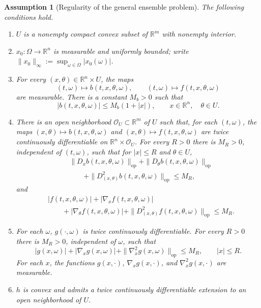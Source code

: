 \documentclass[10pt,a4paper]{amsart}
\newtheorem{assumption}{Assumption}
\begin{document}
\begin{assumption}[Regularity of the general ensemble problem]
\label{ass:general-first-variation}
The following conditions hold.
\begin{enumerate}
    \item $U$ is a nonempty compact convex subset of $\mathbb R^m$ with nonempty interior.
    \item $x_0:\Omega\to\mathbb R^n$ is measurable and uniformly bounded;
    write $\|x_0\|_\infty:=\sup_{\omega\in\Omega}|x_0(\omega)|$.
    \item For every $(x,\theta)$${}\in\mathbb R^n\times U$, the maps
    \[
        (t,\omega)\mapsto b(t,x,\theta,\omega),\qquad
        (t,\omega)\mapsto f(t,x,\theta,\omega)
    \]
    are measurable. There is a constant $M_b>0$ such that
    \[
        |b(t,x,\theta,\omega)|\le M_b(1+|x|),
        \qquad x\in\mathbb R^n,\quad\theta\in U.
    \]
    \item There is an open neighborhood $\mathcal O_U\subset\mathbb R^m$
    of $U$ such that, for each $(t,\omega)$, the maps
    $(x,\theta)\mapsto b(t,x,\theta,\omega)$ and
    $(x,\theta)\mapsto f(t,x,\theta,\omega)$ are twice continuously
    differentiable on $\mathbb R^n\times\mathcal O_U$.
    For every $R>0$ there is $M_R>0$, independent of $(t,\omega)$, such that
    for $|x|\le R$ and $\theta\in U$,
    \[
        \begin{aligned}
        &\|D_x b(t,x,\theta,\omega)\|_{\mathrm{op}}
        +\|D_\theta b(t,x,\theta,\omega)\|_{\mathrm{op}}
        \\
        &\qquad+\|D^2_{(x,\theta)}b(t,x,\theta,\omega)\|_{\mathrm{op}}\le M_R,
        \end{aligned}
    \]
    and
    \[
        \begin{aligned}
        &|f(t,x,\theta,\omega)|+|\nabla_xf(t,x,\theta,\omega)|
        \\
        &\qquad+|\nabla_\theta f(t,x,\theta,\omega)|
        +\|D^2_{(x,\theta)}f(t,x,\theta,\omega)\|_{\mathrm{op}}\le M_R.
        \end{aligned}
    \]
    \item For each $\omega$, $g(\cdot,\omega)$ is twice continuously
    differentiable. For every $R>0$ there is $M_R>0$, independent of
    $\omega$, such that
    \[
        |g(x,\omega)|+|\nabla_xg(x,\omega)|
        +\|\nabla_x^2g(x,\omega)\|_{\mathrm{op}}\le M_R,\qquad |x|\le R.
    \]
    For each $x$, the functions $g(x,\cdot)$, $\nabla_xg(x,\cdot)$,
    and $\nabla_x^2g(x,\cdot)$ are measurable.
    \item $h$ is convex and admits a twice continuously differentiable
    extension to an open neighborhood of $U$.
\end{enumerate}
\end{assumption}
\end{document}
